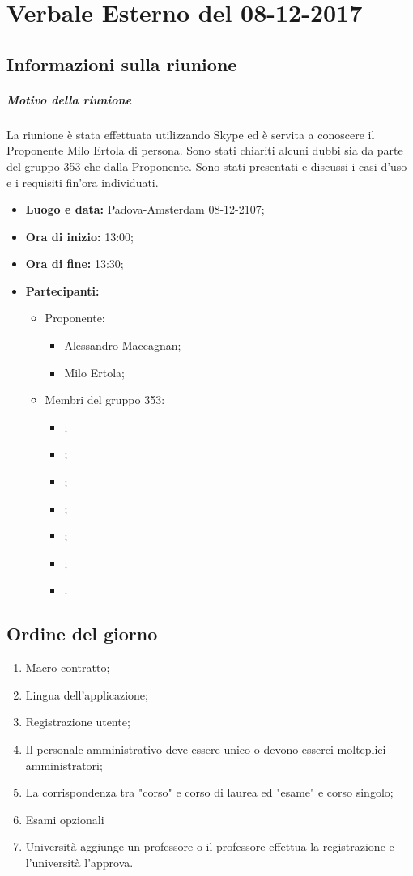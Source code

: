 \documentclass[RaccoltaVerbali.tex]{subfiles}
\begin{document}
\chapter{Verbale Esterno del 08-12-2017}
\section{Informazioni sulla riunione}
\paragraph{Motivo della riunione}
La riunione è stata effettuata utilizzando Skype ed è servita a conoscere il Proponente Milo Ertola di persona. Sono stati chiariti alcuni dubbi sia da parte del gruppo 353 che dalla Proponente. Sono stati presentati e discussi i casi d'uso e i requisiti fin'ora individuati.
\begin{itemize}
	\item \textbf{Luogo e data:} Padova-Amsterdam 08-12-2107;
	\item \textbf{Ora di inizio:} 13:00;
	\item \textbf{Ora di fine:} 13:30;
	\item \textbf{Partecipanti:}
	\begin{itemize}
		\item Proponente:
		\begin{itemize}
			\item Alessandro Maccagnan;
			\item Milo Ertola;
		\end{itemize}
		\item Membri del gruppo 353:
		\begin{itemize}
			\item \Davide;
			\item \Elena;
			\item \Gianluca;
			\item \Mirco;
			\item \Parwinder;
			\item \Riccardo;
			\item \Valentina.
		\end{itemize}
	\end{itemize}
\end{itemize}
\section{Ordine del giorno}	
\begin{enumerate}
	\item Macro contratto; 
	\item Lingua dell'applicazione;
	\item Registrazione utente;
	\item Il personale amministrativo deve essere unico o devono esserci molteplici amministratori;
	\item La corrispondenza tra  "corso" e corso di laurea ed "esame" e corso singolo;
	\item Esami opzionali
	\item Università aggiunge un professore o il professore effettua la registrazione e l'università l'approva.
\end{enumerate}
\end{document}
